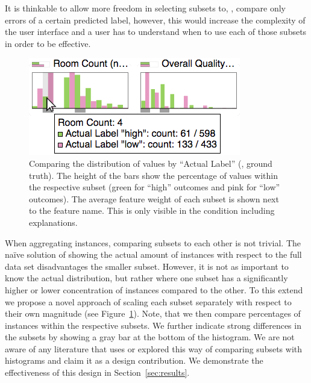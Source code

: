 It is thinkable to allow more freedom in selecting subsets to, \eg, compare only errors of a certain predicted label, however, this would increase the complexity of the user interface and a user has to understand when to use each of those subsets in order to be effective.

\begin{figure}[t]
\centering
\includegraphics[width=0.7\linewidth]{aggexplain/histogram}
\caption[Comparing the distribution of values by ``Actual Label''.]{
Comparing the distribution of values by ``Actual Label'' (\ie, ground truth).
The height of the bars show the percentage of values within the respective subset (green for ``high'' outcomes and pink for ``low'' outcomes).
The average feature weight of each subset is shown next to the feature name.
This is only visible in the condition including explanations.
}
\label{figs:histogram}
\end{figure}

When aggregating instances, comparing subsets to each other is not trivial.
The na\"ive solution of showing the actual amount of instances with respect to the full data set disadvantages the smaller subset.
However, it is not as important to know the actual distribution, but rather where one subset has a significantly higher or lower concentration of instances compared to the other.
To this extend we propose a novel approach of scaling each subset separately with respect to their own magnitude (see Figure~\ref{figs:histogram}).
Note, that we then compare percentages of instances within the respective subsets.
We further indicate strong differences in the subsets by showing a gray bar at the bottom of the histogram.
We are not aware of any literature that uses or explored this way of comparing subsets with histograms and claim it as a design contribution.
We demonstrate the effectiveness of this design in Section~\ref{sec:results}.

